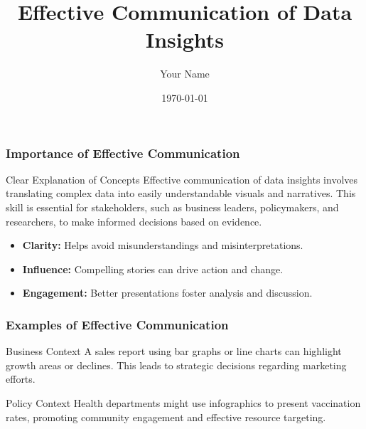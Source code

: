\documentclass{beamer}
\title{Effective Communication of Data Insights}
\author{Your Name}
\institute{Your Institution}
\date{\today}
\begin{document}
\frame{\titlepage}

\begin{frame}[fragile]
    \titlepage
\end{frame}

\begin{frame}[fragile]
    \frametitle{Importance of Effective Communication}

    \begin{block}{Clear Explanation of Concepts}
        Effective communication of data insights involves translating complex data into easily understandable visuals and narratives. This skill is essential for stakeholders, such as business leaders, policymakers, and researchers, to make informed decisions based on evidence.
    \end{block}

    \begin{itemize}
        \item \textbf{Clarity:} Helps avoid misunderstandings and misinterpretations.
        \item \textbf{Influence:} Compelling stories can drive action and change.
        \item \textbf{Engagement:} Better presentations foster analysis and discussion.
    \end{itemize}
\end{frame}

\begin{frame}[fragile]
    \frametitle{Examples of Effective Communication}

    \begin{block}{Business Context}
        A sales report using bar graphs or line charts can highlight growth areas or declines. This leads to strategic decisions regarding marketing efforts.
    \end{block}

    \begin{block}{Policy Context}
        Health departments might use infographics to present vaccination rates, promoting community engagement and effective resource targeting.
    \end{block}
\end{frame}
\end{document}
